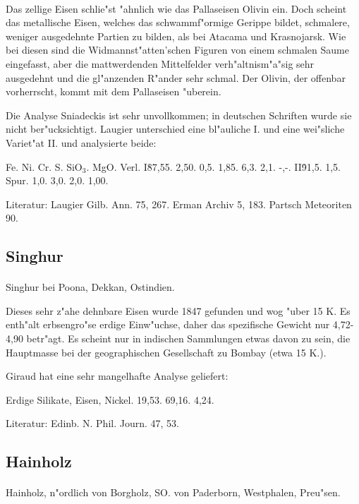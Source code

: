 \documentclass[a4paper, 11pt, oneside]{article}
\begin{document}
\paragraph{}
Das zellige Eisen schlie"st "ahnlich wie das Pallaseisen Olivin ein. Doch scheint das metallische Eisen, welches das schwammf"ormige Gerippe bildet, schmalere, weniger ausgedehnte Partien zu bilden, als bei Atacama und Krasnojarsk. Wie bei diesen sind die Widmannst"atten'schen Figuren von einem schmalen Saume eingefasst, aber die mattwerdenden Mittelfelder verh"altnism"a"sig sehr ausgedehnt und die gl"anzenden R"ander sehr schmal. Der Olivin, der offenbar vorherrscht, kommt mit dem Pallaseisen "uberein.

Die Analyse Sniadeckis ist sehr unvollkommen; in deutschen Schriften wurde sie nicht ber"ucksichtigt. Laugier unterschied eine bl"auliche I. und eine wei"sliche Variet"at II. und analysierte beide:

Fe. Ni. Cr. S. SiO$_{3}$. MgO. Verl.  
I\. 87,55. 2,50. 0,5. 1,85. 6,3. 2,1. -,-.  
II\. 91,5. 1,5. Spur. 1,0. 3,0. 2,0. 1,00.

\footnotesize
Literatur: Laugier Gilb. Ann. 75, 267. Erman Archiv 5, 183. Partsch Meteoriten 90.

\subsection{Singhur}
\normalsize
\paragraph{}
Singhur bei Poona, Dekkan, Ostindien.

Dieses sehr z"ahe dehnbare Eisen wurde 1847 gefunden und wog "uber 15 K. Es enth"alt erbsengro"se erdige Einw"uchse, daher das spezifische Gewicht nur 4,72-4,90 betr"agt. Es scheint nur in indischen Sammlungen etwas davon zu sein, die Hauptmasse bei der geographischen Gesellschaft zu Bombay (etwa 15 K.).

Giraud hat eine sehr mangelhafte Analyse geliefert:

Erdige Silikate, Eisen, Nickel.  
19,53. 69,16. 4,24.

\footnotesize
Literatur: Edinb. N. Phil. Journ. 47, 53.

\subsection{Hainholz}
\normalsize
\paragraph{}
Hainholz, n"ordlich von Borgholz, SO. von Paderborn, Westphalen, Preu"sen.
\end{document}
